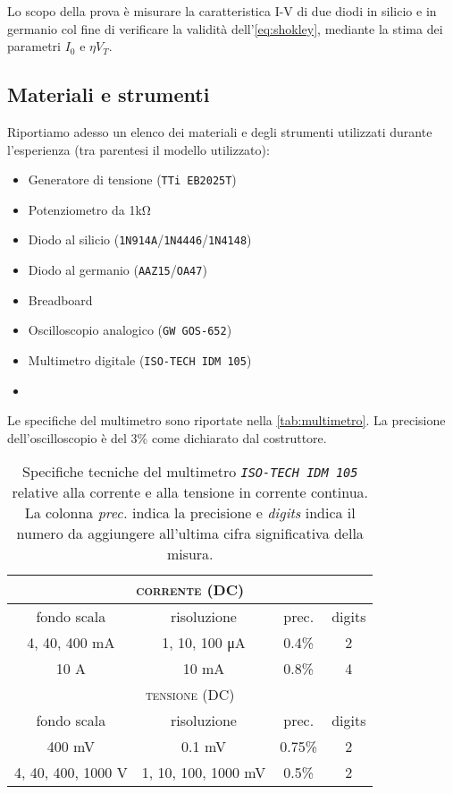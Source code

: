 Lo scopo della prova è misurare la caratteristica I-V di due diodi in silicio e in germanio col fine di verificare la validità dell'\autoref{eq:shokley}, mediante la stima dei parametri $I_0$ e $\eta V_T$.

\subsection{Materiali e strumenti}

Riportiamo adesso un elenco dei materiali e degli strumenti utilizzati durante l’esperienza (tra parentesi il modello utilizzato):
\begin{multicols}{2}
    \begin{itemize}
        \item Generatore di tensione (\verb|TTi EB2025T|)
        \item Potenziometro da 1\si{\kilo\ohm}
        \item Diodo al silicio (\verb|1N914A|/\verb|1N4446|/\verb|1N4148|)
        \item Diodo al germanio (\verb|AAZ15|/\verb|OA47|)
        \item Breadboard
        \item Oscilloscopio analogico (\verb|GW GOS-652|)
        \item Multimetro digitale (\verb|ISO-TECH IDM 105|)
        \item [\vspace{\fill}]
    \end{itemize}
\end{multicols}
\noindent Le specifiche del multimetro sono riportate nella \autoref{tab:multimetro}. La precisione dell'oscilloscopio è del 3\% come dichiarato dal costruttore.

\begin{table}[h]
    \centering
    \begin{tabular}{||c|c|c|c||}
        \hline\hline
        \multicolumn{4}{||c||}{\textsc{corrente (DC)}}\\
        \hline\hline
        fondo scala & risoluzione & prec. & digits \\\hline
        4, 40, 400 \si{\milli\ampere} & 1, 10, 100 \si{\micro\ampere} & 0.4\% & 2\\
        10 \si{\ampere} & 10 \si{\milli\ampere} & 0.8\% & 4\\
        \hline\hline
        \multicolumn{4}{||c||}{\textsc{tensione (DC)}}\\
        \hline\hline
        fondo scala & risoluzione & prec. & digits \\\hline
        400 \si{\milli\volt} & 0.1 \si{\milli\volt} & 0.75\% & 2\\
        4, 40, 400, 1000 \si{\volt} & 1, 10, 100, 1000 \si{\milli\volt} & 0.5\% & 2\\
        \hline\hline
    \end{tabular}
    \caption{Specifiche tecniche del multimetro \emph{\texttt{ISO-TECH IDM 105}} relative alla corrente e alla tensione in corrente continua. La colonna \emph{prec.} indica la precisione e \emph{digits} indica il numero da aggiungere all'ultima cifra significativa della misura.}
    \label{tab:multimetro}
\end{table}


